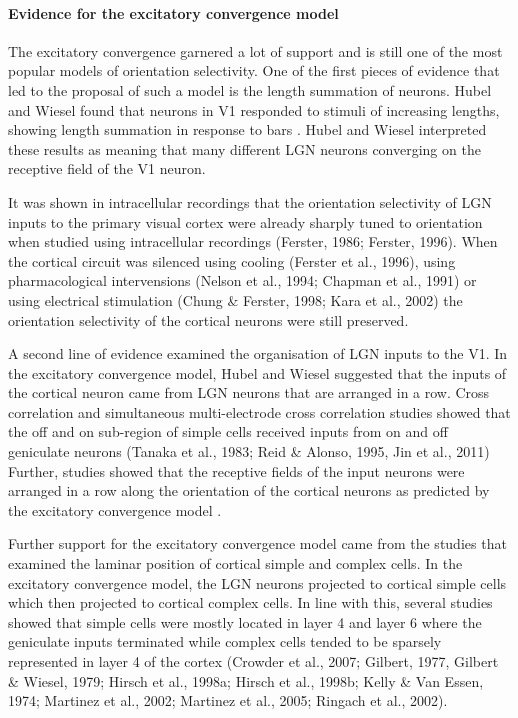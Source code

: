 \paragraph{Evidence for the excitatory convergence model}

The excitatory convergence garnered a lot of support and is still one of the most popular models of orientation selectivity. One of the first pieces of evidence that led to the proposal of such a model is the length summation of neurons. Hubel and Wiesel found that neurons in V1 responded to stimuli of increasing lengths, showing length summation in response to bars \cite{Hubel1962d, Gilbert1977, Rose1977}. Hubel and Wiesel interpreted these results as meaning that many different LGN neurons converging on the receptive field of the V1 neuron. 

It was shown in intracellular recordings that the orientation selectivity of LGN inputs to the primary visual cortex were already sharply tuned to orientation when studied using intracellular recordings (Ferster, 1986; Ferster, 1996). When the cortical circuit was silenced using cooling (Ferster et al., 1996), using pharmacological intervensions (Nelson et al., 1994; Chapman et al., 1991) or using electrical stimulation (Chung \& Ferster, 1998; Kara et al., 2002) the orientation selectivity of the cortical neurons were still preserved.

A second line of evidence examined the organisation of LGN inputs to the V1. In the excitatory convergence model, Hubel and Wiesel suggested that the inputs of the cortical neuron came from LGN neurons that are arranged in a row. Cross correlation and simultaneous multi-electrode cross correlation studies showed that the off and on sub-region of simple cells received inputs from on and off geniculate neurons (Tanaka et al., 1983; Reid \& Alonso, 1995, Jin et al., 2011) Further, studies showed that the receptive fields of the input neurons were arranged in a row along the orientation of the cortical neurons as predicted by the excitatory convergence model \cite{Mooser2004a, ClayReid1995}.

Further support for the excitatory convergence model came from the studies that examined the laminar position of cortical simple and complex cells. In the excitatory convergence model, the LGN neurons projected to cortical simple cells which then projected to cortical complex cells. In line with this, several studies showed that simple cells were mostly located in layer 4 and layer 6 where the geniculate inputs terminated while complex cells tended to be sparsely represented in layer 4 of the cortex (Crowder et al., 2007; Gilbert, 1977, Gilbert \& Wiesel, 1979; Hirsch et al., 1998a; Hirsch et al., 1998b; Kelly \& Van Essen, 1974; Martinez et al., 2002; Martinez et al., 2005; Ringach et al., 2002).

